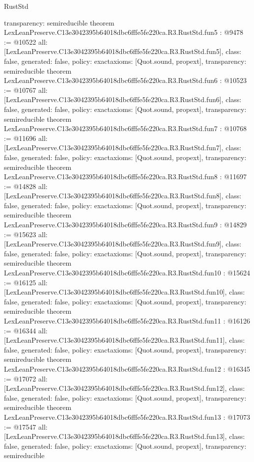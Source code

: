 \begin{lexlean}{RustStd}
\begin{coremodule}
{  transparency: semireducible
}
theorem LexLeanPreserve.C13e3042395b64018dbc6fffe5fe220ca.R3.RustStd.fun5 : @9478 := @10522 {
  all: [LexLeanPreserve.C13e3042395b64018dbc6fffe5fe220ca.R3.RustStd.fun5],
  class: false,
  generated: false,
  policy: exact{axioms: [Quot.sound, propext]},
  transparency: semireducible
}
theorem LexLeanPreserve.C13e3042395b64018dbc6fffe5fe220ca.R3.RustStd.fun6 : @10523 := @10767 {
  all: [LexLeanPreserve.C13e3042395b64018dbc6fffe5fe220ca.R3.RustStd.fun6],
  class: false,
  generated: false,
  policy: exact{axioms: [Quot.sound, propext]},
  transparency: semireducible
}
theorem LexLeanPreserve.C13e3042395b64018dbc6fffe5fe220ca.R3.RustStd.fun7 : @10768 := @11696 {
  all: [LexLeanPreserve.C13e3042395b64018dbc6fffe5fe220ca.R3.RustStd.fun7],
  class: false,
  generated: false,
  policy: exact{axioms: [Quot.sound, propext]},
  transparency: semireducible
}
theorem LexLeanPreserve.C13e3042395b64018dbc6fffe5fe220ca.R3.RustStd.fun8 : @11697 := @14828 {
  all: [LexLeanPreserve.C13e3042395b64018dbc6fffe5fe220ca.R3.RustStd.fun8],
  class: false,
  generated: false,
  policy: exact{axioms: [Quot.sound, propext]},
  transparency: semireducible
}
theorem LexLeanPreserve.C13e3042395b64018dbc6fffe5fe220ca.R3.RustStd.fun9 : @14829 := @15623 {
  all: [LexLeanPreserve.C13e3042395b64018dbc6fffe5fe220ca.R3.RustStd.fun9],
  class: false,
  generated: false,
  policy: exact{axioms: [Quot.sound, propext]},
  transparency: semireducible
}
theorem LexLeanPreserve.C13e3042395b64018dbc6fffe5fe220ca.R3.RustStd.fun10 : @15624 := @16125 {
  all: [LexLeanPreserve.C13e3042395b64018dbc6fffe5fe220ca.R3.RustStd.fun10],
  class: false,
  generated: false,
  policy: exact{axioms: [Quot.sound, propext]},
  transparency: semireducible
}
theorem LexLeanPreserve.C13e3042395b64018dbc6fffe5fe220ca.R3.RustStd.fun11 : @16126 := @16344 {
  all: [LexLeanPreserve.C13e3042395b64018dbc6fffe5fe220ca.R3.RustStd.fun11],
  class: false,
  generated: false,
  policy: exact{axioms: [Quot.sound, propext]},
  transparency: semireducible
}
theorem LexLeanPreserve.C13e3042395b64018dbc6fffe5fe220ca.R3.RustStd.fun12 : @16345 := @17072 {
  all: [LexLeanPreserve.C13e3042395b64018dbc6fffe5fe220ca.R3.RustStd.fun12],
  class: false,
  generated: false,
  policy: exact{axioms: [Quot.sound, propext]},
  transparency: semireducible
}
theorem LexLeanPreserve.C13e3042395b64018dbc6fffe5fe220ca.R3.RustStd.fun13 : @17073 := @17547 {
  all: [LexLeanPreserve.C13e3042395b64018dbc6fffe5fe220ca.R3.RustStd.fun13],
  class: false,
  generated: false,
  policy: exact{axioms: [Quot.sound, propext]},
  transparency: semireducible
}
\end{coremodule}
\end{lexlean}
